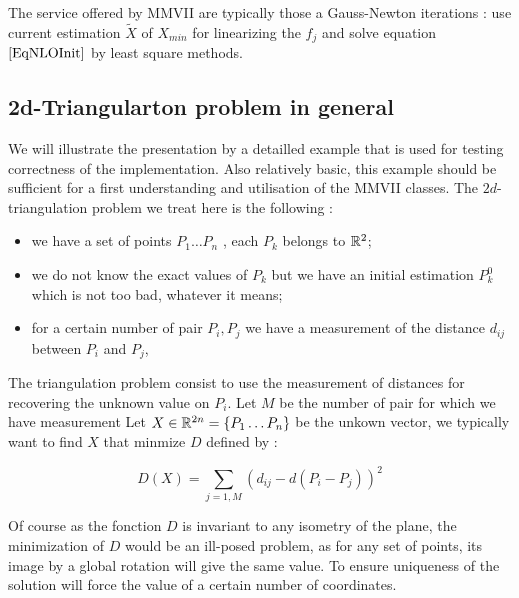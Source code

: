 The service offered by MMVII are typically those a Gauss-Newton iterations : 
use current estimation $\tilde X$ of $X_{min}$ for linearizing the $f_j$ and 
solve equation $\ref{EqNLOInit}$ by least square methods.


\subsection{2d-Triangularton problem in general}

We will illustrate the presentation by a detailled example that is used for testing correctness of the
implementation. Also relatively basic, this example should be sufficient for a first 
understanding and utilisation of the MMVII classes. The $2d$-triangulation problem we treat
here is the following :

\begin{itemize}
    \item we have a set of points $P_1 \dots P_n$ , each $P_k$ belongs to $\mathbb{R}^2$;

    \item we do not know the exact values of $P_k$ but we have an initial estimation  $P^0_k$
          which is not too bad, whatever it means;

    \item for a certain number of pair $P_i,P_j$ we have a measurement of the distance $d_{ij}$ between
          $P_i$ and $P_j$,
\end{itemize}

The triangulation problem  consist to use the measurement of distances for recovering the unknown
value on $P_i$.  Let $M$ be the  number of pair for which we have measurement 
Let $X \in \mathbb{R}^{2n} = \{P_1 \dots P_n\}$ be the unkown vector,
we typically want to find $X$ that minmize $D$ defined by :

\begin{equation}
      D(X) = \sum_{j=1,M} (d_{ij} -d(P_i-P_j))^2  \label{EqConsDist}
\end{equation}


Of course as the fonction $D$ is invariant to any isometry of the plane, the minimization
of $D$ would be an ill-posed problem, as for any set of points, its image by a global rotation
will give the same value. To ensure uniqueness of the solution  will force the value of
a certain number of coordinates.


